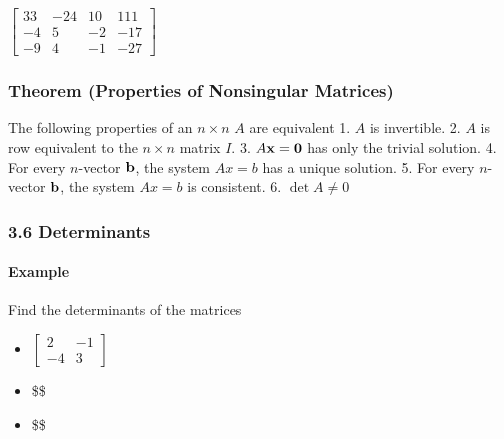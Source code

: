 \documentclass[11pt]{article}
\providecommand{\tightlist}{%
      \setlength{\itemsep}{0pt}\setlength{\parskip}{0pt}}
\newcommand{\prompt}[4]{
        \ttfamily\llap{{\color{#2}[#3]:\hspace{3pt}#4}}\vspace{-\baselineskip}
    }
\begin{document}
            
\prompt{Out}{outcolor}{6}{}
    
    $\displaystyle \left[\begin{matrix}33 & -24 & 10 & 111\\-4 & 5 & -2 & -17\\-9 & 4 & -1 & -27\end{matrix}\right]$

    

    \hypertarget{theorem-properties-of-nonsingular-matrices}{%
\subsubsection{Theorem (Properties of Nonsingular
Matrices)}\label{theorem-properties-of-nonsingular-matrices}}

The following properties of an \(n\times n\) \(A\) are equivalent 1.
\(A\) is invertible. 2. \(A\) is row equivalent to the \(n\times n\)
matrix \(I\). 3. \(A{\bf x}=\bf 0\) has only the trivial solution. 4.
For every \(n\)-vector \(\bf b\), the system \(Ax=b\) has a unique
solution. 5. For every \(n\)-vector \(\bf b\), the system \(Ax=b\) is
consistent. 6. \(\det{A}\not=0\)

    \hypertarget{determinants}{%
\subsubsection{3.6 Determinants}\label{determinants}}

\hypertarget{example}{%
\paragraph{Example}\label{example}}

Find the determinants of the matrices

\begin{itemize}
\tightlist
\item
  \(\left[\begin{array}{cc}2 & -1 \\ -4 & 3\end{array}\right]\)
\item
  \$ \$
\item
  \$ \$
\end{itemize}
\end{document}
